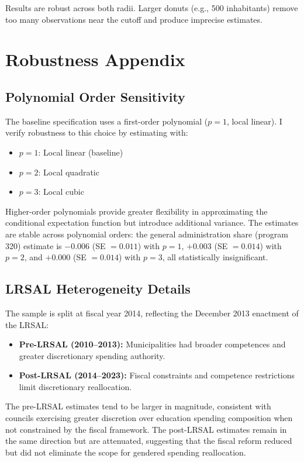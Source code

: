 \documentclass[12pt]{article}
\begin{document}
Results are robust across both radii. Larger donuts (e.g., 500 inhabitants) remove too many observations near the cutoff and produce imprecise estimates.


\section{Robustness Appendix}

\subsection{Polynomial Order Sensitivity}

The baseline specification uses a first-order polynomial ($p=1$, local linear). I verify robustness to this choice by estimating with:

\begin{itemize}
    \item $p = 1$: Local linear (baseline)
    \item $p = 2$: Local quadratic
    \item $p = 3$: Local cubic
\end{itemize}

Higher-order polynomials provide greater flexibility in approximating the conditional expectation function but introduce additional variance. The estimates are stable across polynomial orders: the general administration share (program 320) estimate is $-0.006$ (SE $= 0.011$) with $p = 1$, $+0.003$ (SE $= 0.014$) with $p = 2$, and $+0.000$ (SE $= 0.014$) with $p = 3$, all statistically insignificant.

\subsection{LRSAL Heterogeneity Details}

The sample is split at fiscal year 2014, reflecting the December 2013 enactment of the LRSAL:

\begin{itemize}
    \item \textbf{Pre-LRSAL (2010--2013):} Municipalities had broader competences and greater discretionary spending authority.
    \item \textbf{Post-LRSAL (2014--2023):} Fiscal constraints and competence restrictions limit discretionary reallocation.
\end{itemize}

The pre-LRSAL estimates tend to be larger in magnitude, consistent with councils exercising greater discretion over education spending composition when not constrained by the fiscal framework. The post-LRSAL estimates remain in the same direction but are attenuated, suggesting that the fiscal reform reduced but did not eliminate the scope for gendered spending reallocation.
\end{document}
